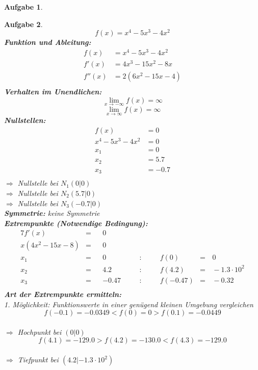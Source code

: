 \documentclass[12pt]{article}
\theoremstyle{note}
\newtheorem{aufgabe}{Aufgabe}
\begin{document}
\begin{flushleft}
\begin{aufgabe}
\end{aufgabe}\clearpage\begin{aufgabe} ~  
$$f(x)=x^{4} - 5 x^{3} - 4 x^{2}$$ 
{\bf Funktion und Ableitung:} 
\begin{align*} 
f(x)&=x^{4} - 5 x^{3} - 4 x^{2}\\ 
f'(x)&=4 x^{3} - 15 x^{2} - 8 x\\ 
f''(x)&=2 \left(6 x^{2} - 15 x - 4\right)\\ 
\end{align*} 
{\bf Verhalten im Unendlichen:} 
\[ \lim_{x\rightarrow -\infty} f(x) =\infty\]\[ \lim_{x\rightarrow\infty} f(x) =\infty\]{\bf Nullstellen:} 
\begin{align*} 
f(x)&=0 \\ 
x^{4} - 5 x^{3} - 4 x^{2}&=0 \\ 
x_1&=0\\ 
x_2&=5.7\\ 
x_3&=-0.7\\ 
\end{align*} 
$\Rightarrow$ Nullstelle bei $N_1(0|0)$ \\ 
$\Rightarrow$ Nullstelle bei $N_2(5.7|0)$ \\ 
$\Rightarrow$ Nullstelle bei $N_3(-0.7|0)$ \\ 
{\bf Symmetrie:} 
keine Symmetrie \\ 
{\bf Extrempunkte (Notwendige Bedingung):} 
\begin{alignat*}{7} 
f'(x)&=& &0& \\ 
x \left(4 x^{2} - 15 x - 8\right)&=& &0& \\ 
x_1&=& &0& \quad &:& \quad &f(0)&=& \,0\\ 
x_2&=& &4.2& \quad &:& \quad &f(4.2)&=& \,-1.3 \cdot 10^{2}\\ 
x_3&=& &-0.47& \quad &:& \quad &f(-0.47)&=& \,-0.32\\ 
\end{alignat*} 
{\bf Art der Extrempunkte ermitteln:} \\[1em] 
{\em 1. M\"oglichkeit:} Funktionswerte in einer gen\"ugend kleinen Umgebung vergleichen \\ 
$$f(-0.1)=-0.0349  <  f(0)=0  >  f(0.1)=-0.0449$$\\ 
$\Rightarrow$ Hochpunkt bei $(0|0)$ \\ 
\vspace{1em}$$f(4.1)=-129.0  >  f(4.2)=-130.0  <   f(4.3)=-129.0$$\\ 
$\Rightarrow$ Tiefpunkt bei $(4.2|-1.3 \cdot 10^{2})$ \\ 

\end{aufgabe}
\end{flushleft}
\end{document}

